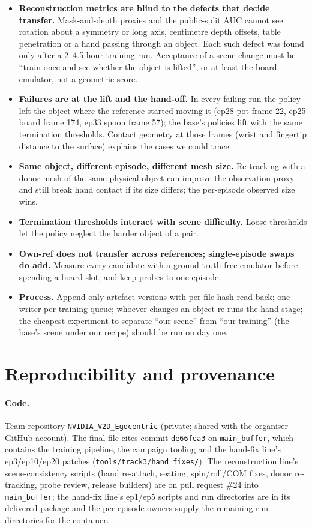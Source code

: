 \documentclass[10pt,a4paper]{article}
\newcommand{\code}[1]{\texttt{#1}}
\begin{document}
\begin{itemize}
\item \textbf{Reconstruction metrics are blind to the defects that decide transfer.} Mask-and-depth proxies and the public-split AUC cannot see rotation about a symmetry or long axis, centimetre depth offsets, table penetration or a hand passing through an object. Each such defect was found only after a 2--4.5 hour training run. Acceptance of a scene change must be ``train once and see whether the object is lifted'', or at least the board emulator, not a geometric score.
\item \textbf{Failures are at the lift and the hand-off.} In every failing run the policy left the object where the reference started moving it (ep28 pot frame 22, ep25 board frame 174, ep33 spoon frame 57); the base's policies lift with the same termination thresholds. Contact geometry at those frames (wrist and fingertip distance to the surface) explains the cases we could trace.
\item \textbf{Same object, different episode, different mesh size.} Re-tracking with a donor mesh of the same physical object can improve the observation proxy and still break hand contact if its size differs; the per-episode observed size wins.
\item \textbf{Termination thresholds interact with scene difficulty.} Loose thresholds let the policy neglect the harder object of a pair.
\item \textbf{Own-ref does not transfer across references; single-episode swaps do add.} Measure every candidate with a ground-truth-free emulator before spending a board slot, and keep probes to one episode.
\item \textbf{Process.} Append-only artefact versions with per-file hash read-back; one writer per training queue; whoever changes an object re-runs the hand stage; the cheapest experiment to separate ``our scene'' from ``our training'' (the base's scene under our recipe) should be run on day one.
\end{itemize}

\section{Reproducibility and provenance}
\label{sec:repro}

\paragraph{Code.} Team repository \code{NVIDIA\_V2D\_Egocentric} (private; shared with the organiser GitHub account). The final file cites commit \code{de66fea3} on \code{main\_buffer}, which contains the training pipeline, the campaign tooling and the hand-fix line's ep3/ep10/ep20 patches (\code{tools/track3/hand\_fixes/}). The reconstruction line's scene-consistency scripts (hand re-attach, seating, spin/roll/COM fixes, donor re-tracking, probe review, release builders) are on pull request \#24 into \code{main\_buffer}; the hand-fix line's ep1/ep5 scripts and run directories are in its delivered package and the per-episode owners supply the remaining run directories for the container.
\end{document}
